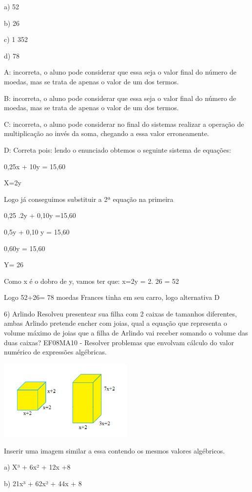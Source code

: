 a) 52

b) 26

c) 1 352

d) 78

A: incorreta, o aluno pode considerar que essa seja o valor final do
número de moedas, mas se trata de apenas o valor de um dos termos.

B: incorreta, o aluno pode considerar que essa seja o valor final do
número de moedas, mas se trata de apenas o valor de um dos termos.

C: incorreta, o aluno pode considerar no final do sistemas realizar a
operação de multiplicação ao invés da soma, chegando a essa valor
erroneamente.

D: Correta pois: lendo o enunciado obtemos o seguinte sistema de
equações:

0,25x + 10y = 15,60

X=2y

Logo já conseguimos substituir a 2ª equação na primeira

0,25 .2y + 0,10y =15,60

0,5y + 0,10 y = 15,60

0,60y = 15,60

Y= 26

Como x é o dobro de y, vamos ter que: x=2y = 2. 26 = 52

Logo 52+26= 78 moedas Frances tinha em seu carro, logo alternativa D

6) Arlindo Resolveu presentear sua filha com 2 caixas de tamanhos
diferentes, ambas Arlindo pretende encher com joias, qual a equação que
representa o volume máximo de joias que a filha de Arlindo vai receber
somando o volume das duas caixas? EF08MA10 - Resolver problemas que
envolvam cálculo do valor numérico de expressões algébricas.

\includegraphics[width=2.63333in,height=1.56545in]{./imgSAEB_8_MAT/media/image55.png}

Inserir uma imagem similar a essa contendo os mesmos valores algébricos.

a) X³ + 6x² + 12x +8

b) 21x³ + 62x² + 44x + 8

